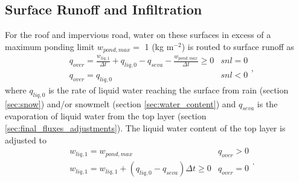 \documentclass[12pt,authoryear]{elsarticle}
\numberwithin{equation}{section} %
\begin{document}
\subsection{Surface Runoff and Infiltration}
\label{sec:surface_runoff_infiltration}
%
For the roof and impervious road, water on these surfaces in excess of a maximum ponding limit $w_{pond,max}=$ 1 (kg m$^{-2}$) is routed to surface runoff as
\begin{equation}
\begin{aligned}
& q_{over} = \frac{w_{liq,1}}{\Delta t} +q_{liq,0}-q_{seva}-\frac{w_{pond,max}}{\Delta t} \geq 0 & snl=0 \\
& q_{over} = q_{liq,0} & snl<0
\end{aligned},
\end{equation}
where $q_{liq,0}$ is the rate of liquid water reaching the surface from rain (section \ref{sec:snow}) and/or snowmelt (section \ref{sec:water_content}) and $q_{seva}$ is the evaporation of liquid water from the top layer (section \ref{sec:final_fluxes_adjustments}). The liquid water content of the top layer is adjusted to
\begin{equation}
\begin{aligned}
& w_{liq,1} = w_{pond,max} & q_{over} >0 \\
& w_{liq,1} = w_{liq,1}+(q_{liq,0}-q_{seva})\Delta t \geq0 & q_{over}=0
\end{aligned}.
\end{equation}
\end{document}
